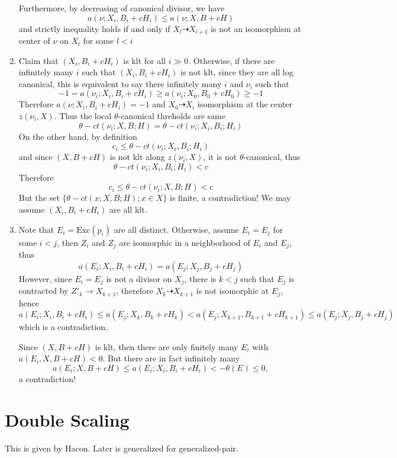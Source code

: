 \documentclass{article}
\begin{document}
\begin{enumerate}[Step 1]
  Furthermore, by decreasing of canonical divisor, we have
  \[ a(\nu;X_i,B_i+cH_i)\leqslant a(\nu;X,B+cH) \]
  and strictly inequality holds if and only if $ X_l\dashrightarrow X_{l+1} $ is not an isomorphism at center of $ \nu $ on $ X_l $ for some $ l<i $
  \item Claim that $ (X_i,B_i+cH_i) $ is klt for all $ i\gg 0 $. Otherwise, if there are infinitely many $ i $ such that $ (X_i,B_i+cH_i) $ is not klt, since they are all log canonical, this is equivalent to say there infinitely many $ i $ and $ \nu_i $ such that
  \[ -1=a(\nu_i;X_i,B_i+cH_i)\geqslant a(\nu_i;X_0,B_0+cH_0)\geqslant -1  \]
  Therefore $ a(\nu;X_i,B_i+cH_i)=-1 $ and $ X_0\dashrightarrow X_i $ isomorphism at the center $ z(\nu_i,X) $. Thus the local $ \theta $-canonical threholds are same
  \[ \theta-ct(\nu_i;X,B;H)=\theta-ct(\nu_i;X_i,B_i;H_i) \]
  On the other hand, by definition
  \[ c_i \leqslant \theta-ct(\nu_i;X_i,B_i;H_i) \]
  and since $ (X,B+cH) $ is not klt along $ z(\nu_i,X) $, it is not $ \theta $-canonical, thus
  \[ \theta-ct(\nu_i;X_i,B_i;H_i)<c \]
  Therefore
  \[ c_i\leqslant \theta-ct(\nu_i;X,B;H)<c \]
  But the set $\{ \theta-ct(x;X,B;H);x\in X\} $ is finite, a contradiction! We may assume $ (X_i,B_i+cH_i) $ are all klt.
  \item Note that $ E_i=\mathrm{Exc}(p_i) $ are all distinct. Otherwise, assume $ E_i=E_j $ for some $ i<j $, then $ Z_i $ and $ Z_j $ are isomorphic in a neighborhood of $ E_i $ and $ E_j $, thus 
  \[ a(E_i;X_i,B_i+cH_i)=a(E_j;X_j,B_j+cH_j) \]
  However, since $ E_i=E_j $ is not a divisor on $ X_j $, there is $ k<j $ such that $ E_j $ is contracted by $ Z'_k\to X_{k+1} $, therefore $ X_k\dashrightarrow X_{k+1} $ is not isomorphic at $ E_j $, hence 
  \[ a(E_i;X_i,B_i+cH_i)\leqslant a(E_j;X_k,B_k+cH_k)<a(E_j;X_{k+1},B_{k+1}+cH_{k+1})\leqslant a(E_j;X_j,B_j+cH_j) \]  
  which is a contradiction.
  
  Since $ (X,B+cH) $ is klt, then there are only finitely many $ E_i $ with $ a(E_i,X,B+cH)<0 $. But there are in fact infinitely many
  \[ a(E_i;X,B+cH)\leqslant  a(E_i;X_i,B_i+cH_i)<-\theta (E)\leqslant 0 ,\] 
  a contradiction! 
\end{enumerate}

\section{Double Scaling}

This is given by Hacon. Later is generalized for generalized-pair.
\end{document}
